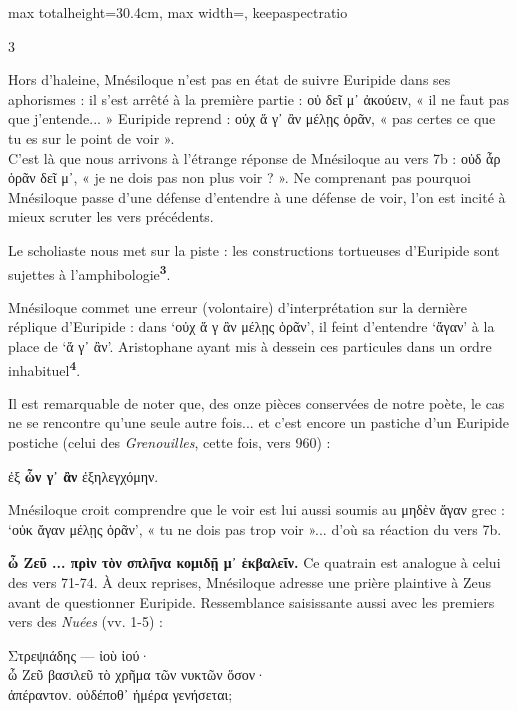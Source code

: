 \documentclass[11pt,twoside]{book}
\newcommand{\italique}[1]{\textit{#1}}
\newcommand{\citComm}[1]{\begin{quoting}[vskip=0.4pt,leftmargin=0.7em,rightmargin=0.2em]#1\end{quoting}}
\newcommand{\marqueur}[1]{\textsuperscript{\color{rubricRed}\textbf{#1}}}
\begin{document}
\begin{adjustbox}{max totalheight=30.4cm, max width=\textwidth, keepaspectratio}
\begin{minipage}{\textwidth}
{\begin{multicols}{3}
\par\vspace{1.5pt}
\noindent Hors d'haleine, Mnésiloque n'est pas en état de suivre Euripide dans ses aphorismes : il s'est arrêté à la première partie : οὐ δεῖ μ᾽ ἀκούειν, « il ne faut pas que j'entende... » Euripide reprend : οὐχ ἅ γ᾽ ἂν μέλῃς ὁρᾶν, « pas certes ce que tu es sur le point de voir ».\\ C'est là que nous arrivons à l'étrange réponse de Mnésiloque au vers 7b : οὐδ ἆρ ὁρᾶν δεῖ μ᾽, « je ne dois pas non plus voir ? ». Ne comprenant pas pourquoi  Mnésiloque passe d'une défense d'entendre à une défense de voir, l'on est incité à mieux scruter les vers précédents.
\par\vspace{1.5pt}
\noindent Le scholiaste nous met sur la piste : les constructions tortueuses d'Euripide sont sujettes à l'amphibologie\marqueur{3}.
\par\vspace{1.5pt}
\noindent Mnésiloque commet une erreur (volontaire) d'interprétation sur la dernière réplique d'Euripide : dans `οὐχ ἅ γ ἂν μέλῃς ὁρᾶν', il feint d'entendre `ἄγαν' à la place de `ἅ γ᾽ ἂν'. Aristophane ayant mis à dessein ces particules dans un ordre inhabituel\marqueur{4}.
\par\vspace{1.5pt}
\noindent Il est remarquable de noter que, des onze pièces conservées de notre poète, le cas ne se rencontre qu'une seule autre fois... et c'est encore un pastiche d'un Euripide postiche (celui des \italique{Grenouilles}, cette fois, vers 960) :
\citComm{ἐξ \textbf{ὧν γ᾽ ἂν} ἐξηλεγχόμην.}
\par\vspace{1.5pt}
\noindent Mnésiloque croit comprendre que le voir est lui aussi soumis au μηδὲν ἄγαν grec : `οὐκ ἄγαν μέλῃς ὁρᾶν', « tu ne dois pas trop voir »... d'où sa réaction du vers 7b.\\
\par\vspace{1.5pt}
 \textbf{ὦ Ζεῦ ... πρὶν τὸν σπλῆνα κομιδῇ μ᾽ ἐκβαλεῖν.} Ce quatrain est analogue à celui des vers 71-74. À deux reprises, Mnésiloque adresse une prière plaintive à Zeus avant de questionner Euripide. Ressemblance saisissante aussi avec les premiers vers des \italique{Nuées} (vv. 1-5) :
\citComm{Στρεψιάδης --- ἰοὺ ἰού·\\
ὦ Ζεῦ βασιλεῦ τὸ χρῆμα τῶν νυκτῶν ὅσον·\\
ἀπέραντον. οὐδέποθ᾽ ἡμέρα γενήσεται;\\
}
\end{multicols}}
\end{minipage}
\end{adjustbox}
\end{document}
